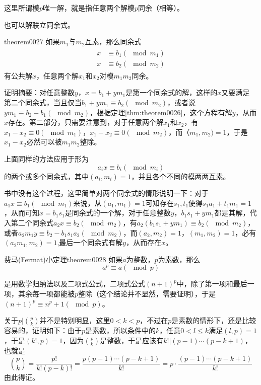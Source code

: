 这里所谓模$p$唯一解，就是指任意两个解模$p$同余（相等）。

也可以解联立同余式。
\begin{theorem}{}{theorem0027}
如果$m_1$与$m_2$互素，那么同余式
\begin{gather}
\begin{aligned}
x &\equiv b_1 (\mod{m_1}) \\
x &\equiv b_2 (\mod{m_2})
\end{aligned}
\end{gather}
有公共解$x$，任意两个解$x_1$和$x_2$对模$m_1m_2$同余。
\end{theorem}

证明摘要：对任意整数$y$，$x = b_1 + ym_1$是第一个同余式的解，这样的$x$又要满足 第二个同余式，当且仅当$b_1+ym_1 \equiv b_2(\mod{m_2})$，或者说$ym_1 \equiv b_2-b_1 (\mod{m_2})$，根据定理\ref{thm:theorem0026}，这个方程有解$y$，从而$x$存在。第二部分，只需要注意到，对于任意两个解$x_1$和$x_2$，有$x_1-x_2 \equiv 0(\mod{m_1})$，$x_1-x_2 \equiv 0 (\mod{m_2})$，而$（m_1, m_2) = 1$，于是$x_1-x_2$必然可以被$m_1m_2$整除。

上面同样的方法应用于形为
\[
a_ix \equiv b_i (\mod{m_i})
\]
的两个或多个同余式，其中$(a_i, m_i)=1$，并且各个不同的模两两互素。

书中没有这个过程，这里简单对两个同余式的情形说明一下：对于$a_1x \equiv b_1(\mod{m_1})$来说，从$(a_1, m_1)=1$可知存在$s_1,t_1$使得$s_1a_1+t_1m_1=1$，从而可知$x = b_1s_1$是同余式的一个解，对于任意整数$y$，$b_1s_1+ym_1$都是其解，代入第二个同余式$a_2x \equiv b_2(\mod{m_2})$，有$a_2(b_1s_1 + ym_1) \equiv b_2(\mod{m_2})$，或者$a_2m_1y \equiv b_2 - b_1s_1a_2 (\mod{m_2})$，而$(a_2, m_2)=1$，$(m_1, m_2)=1$，必有$(a_2m_1, m_2)=1$,最后一个同余式有解$y$，从而存在$x$。

\begin{theorem}{费马(Fermat)小定理}{theorem0028}
如果$a$为整数，$p$为素数，那么
\[
a^p \equiv a(\mod{p})
\]
\end{theorem}

是用数学归纳法以及二项式公式，二项式公式$(n+1)^p$中，除了第一项和最后一项，其余每一项都能被$p$整除（这个结论并不显然，需要证明），于是$(n+1)^p \equiv n^p + 1(\mod{p})$。

关于$p | {p \choose k}$并不是特别明显，这里$0 < k < p$，不过在$p$是素数的情形下，还是比较容易的，证明如下：由于$p$是素数，所以条件中的$k$，任意$0 < l \le k$满足$(l, p)=1$，于是$(k!, p)=1$，因为$p \choose k$是整数，于是应该有$k!|(p-1)\cdots(p-k+1)$，也就是
\[
\binom{p}{k} = \frac{p!}{k!(p-k)!} = \frac{p(p-1)\cdots(p-k+1)}{k!} = p \cdot \frac{(p-1)\cdots(p-k+1)}{k!}
\]
由此得证。


